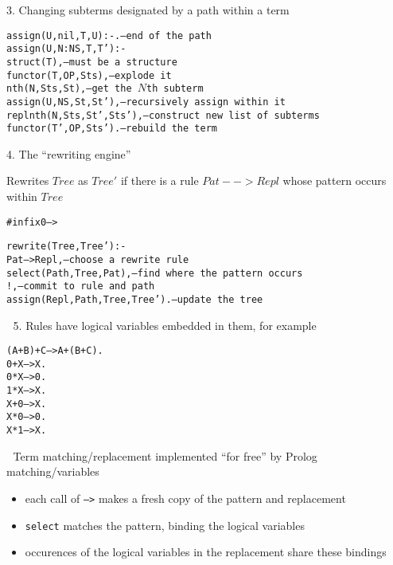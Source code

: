 \documentclass{popl}
\newenvironment{smalltt}{\begin{alltt}\smaller}{\end{alltt}}
\newcommand{\rmbox}[1]{\mbox{{\rm #1}}}
\begin{document}
\begin{foil} 

3. Changing subterms designated by a path within a term
\begin{smalltt}
    assign(U, nil,  T, U)  :- .         -- \rmbox{end of the path}
    assign(U, N:NS, T, T') :- 
          struct(T),                    -- \rmbox{must be a structure}
          functor(T, OP, Sts),          -- \rmbox{explode it}
          nth(N, Sts, St),              -- \rmbox{get the \(N\)th subterm}
          assign(U, NS, St, St'),       -- \rmbox{recursively assign within it}
          replnth(N, Sts, St', Sts'),   -- \rmbox{construct new list of subterms}
          functor(T', OP, Sts').        -- \rmbox{rebuild the term}
\end{smalltt}
\end{foil}

\begin{foil} 
4. The ``rewriting engine''

Rewrites $Tree$ as $Tree'$ if there is a rule $Pat-->Repl$ whose pattern occurs within $Tree$
\begin{smalltt}
    #infix0 -->

    rewrite(Tree, Tree') :-
      Pat --> Repl,                    -- \rmbox{choose a rewrite rule} 
      select(Path, Tree, Pat),         -- \rmbox{find where the pattern occurs}
      !,                               -- \rmbox{commit to rule and path}
      assign(Repl, Path, Tree, Tree'). -- \rmbox{update the tree}
\end{smalltt}

5. Rules have logical variables embedded in them, for example
\begin{smalltt}
    (A+B)+C --> A+(B+C).
    0+X     --> X.
    0*X     --> 0.
    1*X     --> X.
    X+0     --> X.
    X*0     --> 0.
    X*1     --> X.
\end{smalltt}

Term matching/replacement implemented ``for free'' by Prolog matching/variables
\begin{itemize}
\item each call of {\tt -->} makes a fresh copy of the pattern and replacement
\item {\tt select} matches the pattern, binding the logical variables
\item occurences of the logical variables in the replacement share these bindings
\end{itemize}

\end{foil}
\end{document}
